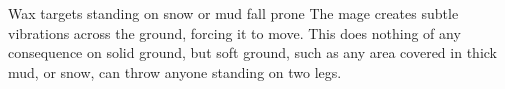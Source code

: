   {\mEarth}%
  {Wax}%
  {}%
  {}%
  {targets standing on snow or mud fall prone}%
  {
    The mage creates subtle vibrations across the ground, forcing it to move.
    This does nothing of any consequence on solid ground, but soft ground, such as any area covered in thick mud, or snow, can throw anyone standing on two legs.
  }

